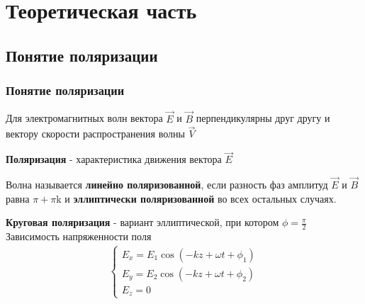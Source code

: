 \documentclass[10pt,pdf,hyperref={unicode}, dvipsnames]{beamer}
\begin{document}
\section{Теоретическая часть}
\subsection{Понятие поляризации}
\begin{frame}[t]
	\frametitle{Понятие поляризации}
	Для электромагнитных волн вектора $\vec{E}$ и $\vec{B}$ перпендикулярны друг другу и вектору скорости распространения волны $\vec{V}$
	
	\textbf{Поляризация} - характеристика движения вектора $\vec{E}$
	
	Волна называется \textbf{линейно поляризованной}, если разность фаз амплитуд $\vec{E}$ и $\vec{B}$ равна $\pi+\pi$k
	и \textbf{эллиптически поляризованной} во всех остальных случаях.
	
	\textbf{Круговая поляризация} - вариант эллиптической, при котором $\phi=\frac{\pi}{2}$
	Зависимость напряженности поля
	\begin{gather}
		\begin{cases} 
			E_x = E_1\cos\left(-kz+\omega t+ \phi_1\right) \\
			E_y = E_2\cos\left(-kz+\omega t+ \phi_2\right) \\
			E_z = 0
		\end{cases}
	\end{gather}
\end{frame}
\end{document}
